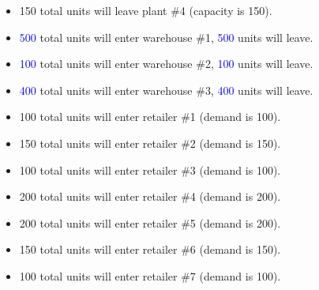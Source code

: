 \documentclass[../report/main.tex]{subfiles}
\begin{document}
\begin{itemize}
	\item 150 total units will leave plant \#4 (capacity is 150).
	\newline
	\item \textcolor{blue}{500} total units will enter warehouse \#1, \textcolor{blue}{500} units will leave.
	\item \textcolor{blue}{100} total units will enter warehouse \#2, \textcolor{blue}{100} units will leave.
	\item \textcolor{blue}{400} total units will enter warehouse \#3, \textcolor{blue}{400} units will leave.
	\newline
	\item 100 total units will enter retailer \#1 (demand is 100).
	\item 150 total units will enter retailer \#2 (demand is 150).
	\item 100 total units will enter retailer \#3 (demand is 100).
	\item 200 total units will enter retailer \#4 (demand is 200).
	\item 200 total units will enter retailer \#5 (demand is 200).
	\item 150 total units will enter retailer \#6 (demand is 150).
	\item 100 total units will enter retailer \#7 (demand is 100).
\end{itemize}
\end{document}
